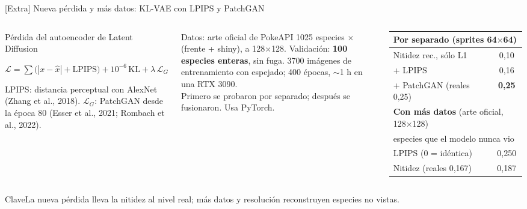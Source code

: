 \documentclass[aspectratio=169]{beamer}
\newcommand{\clave}[1]{%
  \vfill
  \begin{alertblock}{Clave}\footnotesize #1\end{alertblock}}
\begin{document}
\begin{frame}{[Extra] Nueva p\'erdida y m\'as datos: KL-VAE con LPIPS y PatchGAN}
  \begin{columns}[T,onlytextwidth]
      \begin{block}{P\'erdida del autoencoder de Latent Diffusion}
        \scriptsize
        {\centering $\mathcal{L}=\sum\big(|x-\hat{x}|+\mathrm{LPIPS}\big)+10^{-6}\,\mathrm{KL}+\lambda\,\mathcal{L}_G$\par}
        \vspace{0.2em}
        LPIPS: distancia perceptual con AlexNet (Zhang et al., 2018). $\mathcal{L}_G$: PatchGAN desde la \'epoca 80 (Esser et al., 2021; Rombach et al., 2022).
      \end{block}
      \begin{block}{Datos: arte oficial de PokeAPI}
        \scriptsize
        1025 especies $\times$ (frente + shiny), a 128$\times$128. Validaci\'on: \textbf{100 especies enteras}, sin fuga. 3700 im\'agenes de entrenamiento con espejado; 400 \'epocas, $\sim$1 h en una RTX 3090.\\[0.2em]
        {\color{softGray}Primero se probaron por separado; despu\'es se fusionaron. Usa PyTorch.}
      \end{block}
      \centering
      \scriptsize\setlength{\tabcolsep}{4pt}
      \begin{tabular}{lc}
        \toprule
        \multicolumn{2}{l}{\textbf{Por separado} (sprites 64$\times$64)} \\
        \midrule
        Nitidez rec., s\'olo L1 & 0,10 \\
        \quad + LPIPS & 0,16 \\
        \quad + PatchGAN (reales 0,25) & \textbf{0,25} \\
        \midrule
        \multicolumn{2}{l}{\textbf{Con m\'as datos} (arte oficial, 128$\times$128)} \\
        \multicolumn{2}{l}{especies que el modelo nunca vio} \\
        \midrule
        LPIPS (0 = id\'entica) & 0,250 \\
        Nitidez (reales 0,167) & 0,187 \\
        \bottomrule
      \end{tabular}
  \end{columns}
  \clave{La nueva p\'erdida lleva la nitidez al nivel real; m\'as datos y resoluci\'on reconstruyen especies no vistas.}
\end{frame}
\end{document}
